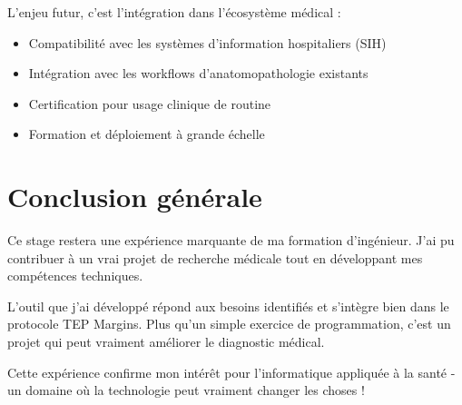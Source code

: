 \documentclass[11pt,a4paper]{report}
\begin{document}
L'enjeu futur, c'est l'intégration dans l'écosystème médical :

\begin{itemize}
\item Compatibilité avec les systèmes d'information hospitaliers (SIH)
\item Intégration avec les workflows d'anatomopathologie existants
\item Certification pour usage clinique de routine
\item Formation et déploiement à grande échelle
\end{itemize}

\section{Conclusion générale}

Ce stage restera une expérience marquante de ma formation d'ingénieur. J'ai pu contribuer à un vrai projet de recherche médicale tout en développant mes compétences techniques.

L'outil que j'ai développé répond aux besoins identifiés et s'intègre bien dans le protocole TEP Margins. Plus qu'un simple exercice de programmation, c'est un projet qui peut vraiment améliorer le diagnostic médical.

Cette expérience confirme mon intérêt pour l'informatique appliquée à la santé - un domaine où la technologie peut vraiment changer les choses !
\end{document}
